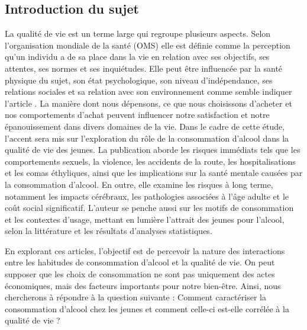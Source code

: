 \documentclass{article}
\begin{document}
\subsection{Introduction du sujet}
La qualité de vie est un terme large qui regroupe plusieurs aspects. Selon l'organisation mondiale de la santé (OMS) elle est définie comme la perception qu’un individu a de sa place dans la vie en relation avec ses objectifs, ses attentes, ses normes et ses inquiétudes. Elle peut être influencée par la santé physique du sujet, son état psychologique, son niveau d’indépendance, ses relations sociales et sa relation avec son environnement comme semble indiquer l'article \cite{article3}.
La manière dont nous dépensons, ce que nous choisissons d'acheter et nos comportements d'achat peuvent influencer notre satisfaction et notre épanouissement dans divers domaines de la vie.  
Dans le cadre de cette étude, l'accent sera mis sur l'exploration du rôle de la consommation d'alcool dans la qualité de vie des jeunes. La publication \cite{article1} aborde les risques immédiats tels que les comportements sexuels, la violence, les accidents de la route, les hospitalisations et les comas éthyliques, ainsi que les implications sur la santé mentale causées par la consommation d'alcool. En outre, elle examine les risques à long terme, notamment les impacts cérébraux, les pathologies associées à l'âge adulte et le coût social significatif. L'auteur se penche aussi sur les motifs de consommation et les contextes d’usage, mettant en lumière l’attrait des jeunes pour l’alcool, selon la littérature et les résultats d’analyses statistiques.

En explorant ces articles, l'objectif est de percevoir la nature des interactions entre les habitudes de consommation d'alcool et la qualité de vie. On peut supposer que les choix de consommation ne sont pas uniquement des actes économiques, mais des facteurs importants pour notre bien-être. Ainsi, nous chercherons à répondre à la question suivante : Comment caractériser la consommation d'alcool chez les jeunes et comment celle-ci est-elle corrélée à la qualité de vie ?
\end{document}
